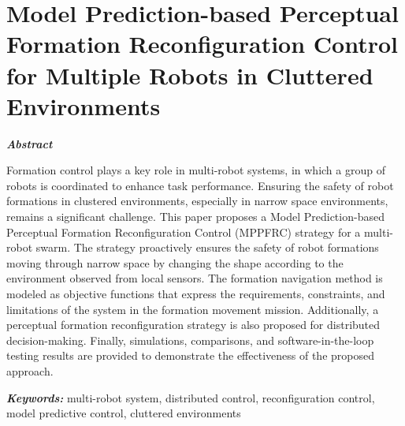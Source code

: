 \chapter{Model Prediction-based Perceptual Formation Reconfiguration Control for Multiple Robots in Cluttered Environments}\label{paper3}

\vspace{1cm}

\noindent\textit{\textbf{Abstract}}

Formation control plays a key role in multi-robot systems, in which a group of robots is coordinated to enhance task performance. Ensuring the safety of robot formations in clustered environments, especially in narrow space environments, remains a significant challenge. This paper proposes a Model Prediction-based Perceptual Formation Reconfiguration Control (MPPFRC) strategy for a multi-robot swarm. The strategy proactively ensures the safety of robot formations moving through narrow space by changing the shape according to the environment observed from local sensors. The formation navigation method is modeled as objective functions that express the requirements, constraints, and limitations of the system in the formation movement mission. Additionally, a perceptual formation reconfiguration strategy is also proposed for distributed decision-making. Finally, simulations, comparisons, and software-in-the-loop testing results are provided to demonstrate the effectiveness of the proposed approach.

\noindent\textbf{\textit{Keywords:}}
multi-robot system, distributed control, reconfiguration control, model predictive control, cluttered environments







